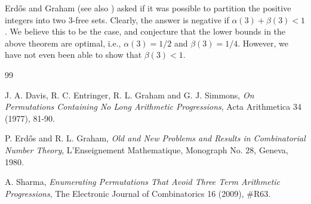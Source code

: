 \documentclass[12pt]{article}
\begin{document}
Erd\H{o}s and Graham \cite{Erd80} (see also \cite{Dav77}) asked if it was 
possible to partition the positive integers into two $3$-free sets. 
Clearly, the answer is negative if $\alpha(3) + \beta(3) < 1$. We believe 
this to be the case, and conjecture that the lower bounds in the above 
theorem are optimal, i.e., $\alpha(3)=1/2$ and $\beta(3)=1/4$. However, we 
have not even been able to show that $\beta(3) < 1$.

\begin{thebibliography}{99}

 J. A. Davis, R. C. Entringer, R. L. Graham and G. J. 
Simmons, {\em {On Permutations Containing No Long Arithmetic 
Progressions}}, Acta Arithmetica 34 (1977), 81-90.

 P. Erd\H{o}s and R. L. Graham, {\em {Old and New Problems 
and Results in Combinatorial Number Theory}}, L'Enseignement Mathematique,
Monograph No. 28, Geneva, 1980.

 A. Sharma, {\em {Enumerating Permutations That Avoid Three 
Term Arithmetic Progressions}}, The Electronic Journal of Combinatorics 16 
(2009), \#R63.

\end{thebibliography}
\end{document}

